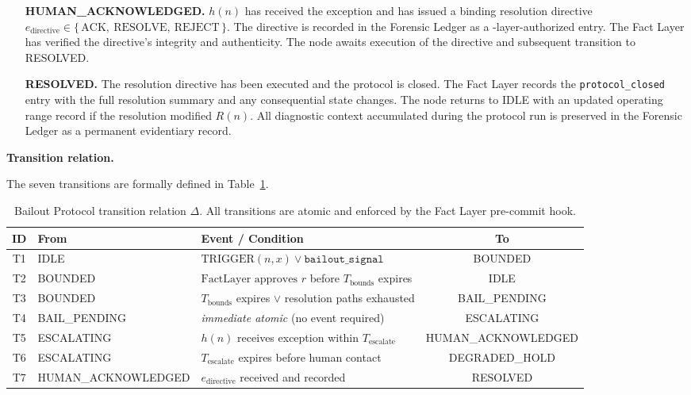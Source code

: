 \begin{enumerate}
\item[\textbf{HUMAN\_ACKNOWLEDGED.}] $h(n)$ has received the exception and has issued a binding resolution directive $e_{\text{directive}} \in \{\,\text{ACK},\ \text{RESOLVE},\ \text{REJECT}\,\}$. The directive is recorded in the Forensic Ledger as a \purpose-layer-authorized entry. The Fact Layer has verified the directive's integrity and authenticity. The node awaits execution of the directive and subsequent transition to RESOLVED.

\item[\textbf{RESOLVED.}] The resolution directive has been executed and the protocol is closed. The Fact Layer records the \texttt{protocol\_closed} entry with the full resolution summary and any consequential state changes. The node returns to IDLE with an updated operating range record if the resolution modified $R(n)$. All diagnostic context accumulated during the protocol run is preserved in the Forensic Ledger as a permanent evidentiary record.
\end{enumerate}

\bigskip
\noindent\textbf{Transition relation.}

The seven transitions are formally defined in Table~\ref{tab:transition-relation}.

\begin{table}[htbp]
\centering
\caption{Bailout Protocol transition relation $\Delta$. All transitions are atomic and enforced by the Fact Layer pre-commit hook.}
\label{tab:transition-relation}
\begin{tabular}{cllc}
\toprule
\textbf{ID} & \textbf{From} & \textbf{Event / Condition} & \textbf{To} \\ \midrule
T1 & IDLE & $\text{TRIGGER}(n, x) \lor \texttt{bailout\_signal}$ & BOUNDED \\
T2 & BOUNDED & $\text{FactLayer approves } r$ before $T_{\text{bounds}}$ expires & IDLE \\
T3 & BOUNDED & $T_{\text{bounds}}$ expires $\lor$ resolution paths exhausted & BAIL\_PENDING \\
T4 & BAIL\_PENDING & \emph{immediate atomic} (no event required) & ESCALATING \\
T5 & ESCALATING & $h(n)$ receives exception within $T_{\text{escalate}}$ & HUMAN\_ACKNOWLEDGED \\
T6 & ESCALATING & $T_{\text{escalate}}$ expires before human contact & DEGRADED\_HOLD \\
T7 & HUMAN\_ACKNOWLEDGED & $e_{\text{directive}}$ received and recorded & RESOLVED \\
\bottomrule
\end{tabular}
\\[6pt]
\end{table}

